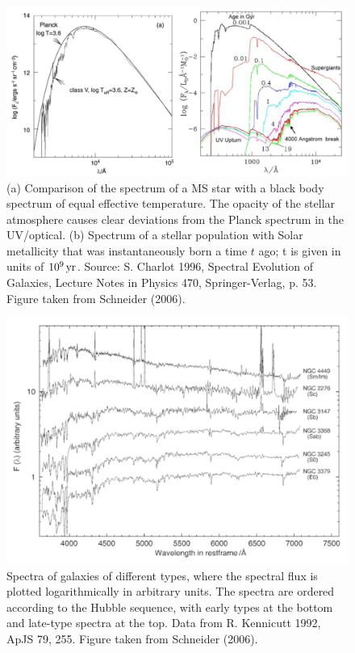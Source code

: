 \documentclass[a4paper,11pt]{article}
\begin{document}
\begin{figure}[t]
    \includegraphics[width=16cm]{figures/SED_SF.png}
    \centering
    \caption{\footnotesize{(a) Comparison of the spectrum of a MS star with a black body spectrum of equal effective temperature. The opacity of the stellar atmosphere causes clear deviations from the Planck spectrum in the UV/optical. (b) Spectrum of a stellar population with Solar metallicity that was instantaneously born a time $t$ ago; t is given in units of $10^9\,{\rm yr}$. Source: S. Charlot 1996, Spectral Evolution of Galaxies, Lecture Notes in Physics 470, Springer-Verlag, p. 53. Figure taken from Schneider (2006).}}
    \label{fig:sedsf}
\end{figure}

\begin{figure}[t]
    \includegraphics[width=16cm]{figures/StellarSpectra.png}
    \centering
    \caption{\footnotesize{Spectra of galaxies of different types, where the spectral flux is plotted logarithmically in arbitrary units. The spectra are ordered according to the Hubble sequence, with early types at the bottom and late-type spectra at the top. Data from R. Kennicutt 1992, ApJS 79, 255. Figure taken from Schneider (2006).}}
    \label{fig:stellarspectra}
\end{figure}
\end{document}
